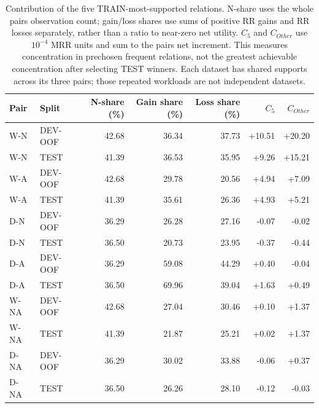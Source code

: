 \begin{table}[htbp]
\centering\footnotesize\setlength{\tabcolsep}{3pt}
\caption{Contribution of the five TRAIN-most-supported relations. N-share uses the whole pair\textquotesingle s observation count; gain/loss shares use sums of positive RR gains and RR losses separately, rather than a ratio to near-zero net utility. $C_5$ and $C_{Other}$ use $10^{-4}$ MRR units and sum to the pair\textquotesingle s net increment. This measures concentration in prechosen frequent relations, not the greatest achievable concentration after selecting TEST winners. Each dataset has shared supports across its three pairs; those repeated workloads are not independent datasets.}
\label{tab:group-concentration}
\begin{tabular}{llrrrrr}
\toprule
Pair & Split & N-share (\%) & Gain share (\%) & Loss share (\%) & $C_5$ & $C_{Other}$\\
\midrule
W-N & DEV-OOF & 42.68 & 36.34 & 37.73 & +10.51 & +20.20\\
W-N & TEST & 41.39 & 36.53 & 35.95 & +9.26 & +15.21\\
W-A & DEV-OOF & 42.68 & 29.78 & 20.56 & +4.94 & +7.09\\
W-A & TEST & 41.39 & 35.61 & 26.36 & +4.93 & +5.21\\
D-N & DEV-OOF & 36.29 & 26.28 & 27.16 & -0.07 & -0.02\\
D-N & TEST & 36.50 & 20.73 & 23.95 & -0.37 & -0.44\\
D-A & DEV-OOF & 36.29 & 59.08 & 44.29 & +0.40 & -0.04\\
D-A & TEST & 36.50 & 69.96 & 39.04 & +1.63 & +0.49\\
W-NA & DEV-OOF & 42.68 & 27.04 & 30.46 & +0.10 & +1.37\\
W-NA & TEST & 41.39 & 21.87 & 25.21 & +0.02 & +1.37\\
D-NA & DEV-OOF & 36.29 & 30.02 & 33.88 & -0.06 & +0.37\\
D-NA & TEST & 36.50 & 26.26 & 28.10 & -0.12 & -0.03\\
\bottomrule
\end{tabular}
\end{table}

